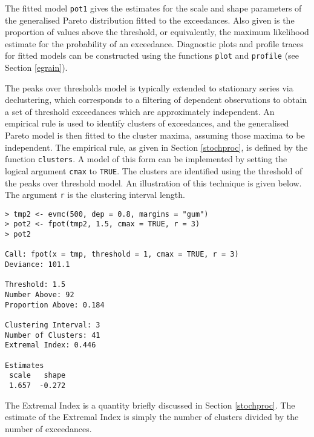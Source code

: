 \documentclass[11pt,a4paper]{article}
\begin{document}
The fitted model \verb+pot1+ gives the estimates for the scale and shape parameters of the generalised Pareto distribution fitted to the exceedances.
Also given is the proportion of values above the threshold, or equivalently, the maximum likelihood estimate for the probability of an exceedance.
Diagnostic plots and profile traces for fitted models can be constructed using the functions \verb+plot+ and \verb+profile+ (see Section \ref{egrain}).

The peaks over thresholds model is typically extended to stationary series via declustering, which corresponds to a filtering of dependent observations to obtain a set of threshold exceedances which are approximately independent.
An empirical rule is used to identify clusters of exceedances, and the generalised Pareto model is then fitted to the cluster maxima, assuming those maxima to be independent.
The empirical rule, as given in Section \ref{stochproc}, is defined by the function \verb+clusters+.
A model of this form can be implemented by setting the logical argument \verb+cmax+ to \verb+TRUE+.
The clusters are identified using the threshold of the peaks over threshold model.
An illustration of this technique is given below. 
The argument \verb+r+ is the clustering interval length.
 
\begin{verbatim}
> tmp2 <- evmc(500, dep = 0.8, margins = "gum")
> pot2 <- fpot(tmp2, 1.5, cmax = TRUE, r = 3)
> pot2

Call: fpot(x = tmp, threshold = 1, cmax = TRUE, r = 3) 
Deviance: 101.1 

Threshold: 1.5 
Number Above: 92          
Proportion Above: 0.184 

Clustering Interval: 3  
Number of Clusters: 41 
Extremal Index: 0.446 

Estimates
 scale   shape  
 1.657  -0.272  
\end{verbatim}

The Extremal Index is a quantity briefly discussed in Section \ref{stochproc}. The estimate of the Extremal Index is simply the number of clusters divided by the number of exceedances. 
\end{document}
